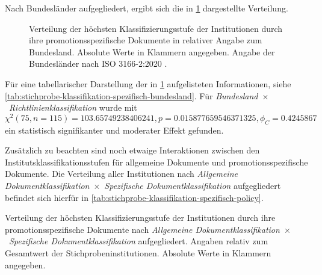 Nach Bundesländer aufgegliedert, ergibt sich die in \cref{fig:policy-klassifikation-spezifisch-absolut} dargestellte Verteilung.
\begin{figure}[!htbp]
    \centering
    \resizebox{\textwidth}{!}{}
    \caption{Verteilung der höchsten Klassifizierungsstufe der Institutionen durch ihre promotionsspezifische Dokumente in relativer Angabe zum Bundesland.
    Absolute Werte in Klammern angegeben.
    Angabe der Bundesländer nach ISO 3166-2:2020 \autocite{ISO3166}.}
    \label{fig:policy-klassifikation-spezifisch-absolut}
\end{figure}
Für eine tabellarischer Darstellung der in \cref{fig:policy-klassifikation-spezifisch-absolut} aufgelisteten Informationen, siehe \cref{tab:stichprobe-klassifikation-spezifisch-bundesland}.
Für \textit{Bundesland}~$\times$~\textit{Richtlinienklassifikation} wurde mit $\chi^2 (\num{75}, n=\num{115}) = \num[round-mode=places,round-precision=2]{103,65749238406241}, p = \num[round-mode=places,round-precision=2]{0,015877659546371325},\phi_C=\num[round-mode=places,round-precision=2]{0.4245867}$ ein statistisch signifikanter und moderater Effekt gefunden.

Zusätzlich zu beachten sind noch etwaige Interaktionen zwischen den Institutsklassifikationsstufen für allgemeine Dokumente und promotionsspezifische Dokumente.
Die Verteilung aller Institutionen nach \textit{Allgemeine Dokumentklassifikation}~$\times$~\textit{Spezifische Dokumentklassifikation} aufgegliedert befindet sich hierfür in \cref{tab:stichprobe-klassifikation-spezifisch-policy}.
\begin{table}[!htbp]
	\caption{Verteilung der höchsten Klassifizierungsstufe der Institutionen durch ihre promotionsspezifische Dokumente nach \textit{Allgemeine Dokumentklassifikation}~$\times$~\textit{Spezifische Dokumentklassifikation} aufgegliedert.
    Angaben relativ zum Gesamtwert der Stichprobeninstitutionen.
    Absolute Werte in Klammern angegeben.}
    
	\label{tab:stichprobe-klassifikation-spezifisch-policy}
\end{table}
\pagebreak

